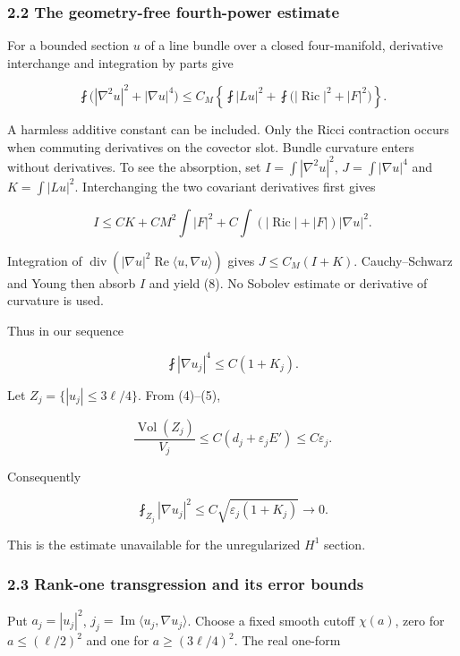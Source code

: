 \documentclass[11pt]{article}
\begin{document}
\hypertarget{the-geometry-free-fourth-power-estimate}{%
\subsubsection{2.2 The geometry-free fourth-power
estimate}\label{the-geometry-free-fourth-power-estimate}}

For a bounded section \(u\) of a line bundle over a closed
four-manifold, derivative interchange and integration by parts give

\[
 \fint\bigl(|\nabla^2u|^2+|\nabla u|^4\bigr)
 \le C_M\left\{\fint|Lu|^2+
 \fint\bigl(|\operatorname{Ric}|^2+|F|^2\bigr)\right\}.
\tag{8}
\]

A harmless additive constant can be included. Only the Ricci contraction
occurs when commuting derivatives on the covector slot. Bundle curvature
enters without derivatives. To see the absorption, set
\(I=\int|\nabla^2u|^2\), \(J=\int|\nabla u|^4\) and \(K=\int|Lu|^2\).
Interchanging the two covariant derivatives first gives

\[
 I\le C K+C M^2\int|F|^2+
 C\int(|\operatorname{Ric}|+|F|)|\nabla u|^2.
\]

Integration of
\(\operatorname{div}(|\nabla u|^2\operatorname{Re}\langle u,\nabla u\rangle)\)
gives \(J\le C_M(I+K)\). Cauchy--Schwarz and Young then absorb \(I\) and
yield (8). No Sobolev estimate or derivative of curvature is used.

Thus in our sequence

\[
 \fint|\nabla u_j|^4\le C(1+K_j).
\tag{9}
\]

Let \(Z_j=\{|u_j|\le3\ell/4\}\). From (4)--(5),

\[
 \frac{\operatorname{Vol}(Z_j)}{V_j}
 \le C(d_j+\varepsilon_j E')\le C\varepsilon_j.
\]

Consequently

\[
 \boxed{\fint_{Z_j}|\nabla u_j|^2
 \le C\sqrt{\varepsilon_j(1+K_j)}\longrightarrow0.}
\tag{10}
\]

This is the estimate unavailable for the unregularized \(H^1\) section.

\hypertarget{rank-one-transgression-and-its-error-bounds}{%
\subsubsection{2.3 Rank-one transgression and its error
bounds}\label{rank-one-transgression-and-its-error-bounds}}

Put \(a_j=|u_j|^2\),
\(j_j=\operatorname{Im}\langle u_j,\nabla u_j\rangle\). Choose a fixed
smooth cutoff \(\chi(a)\), zero for \(a\le(\ell/2)^2\) and one for
\(a\ge(3\ell/4)^2\). The real one-form
\end{document}
